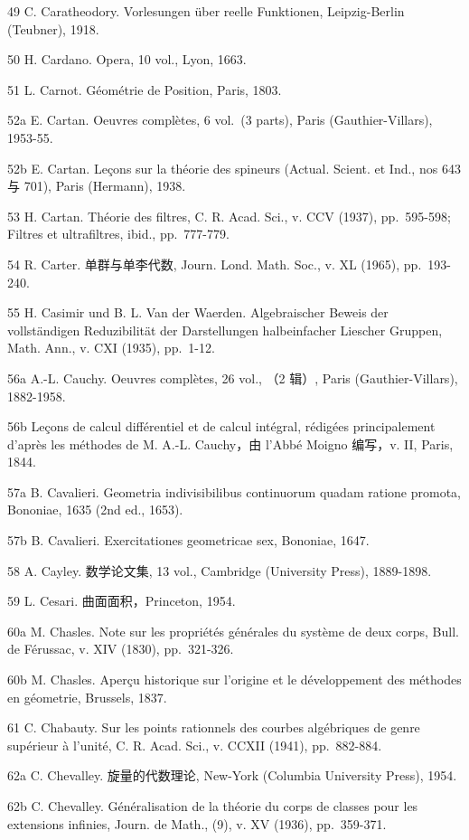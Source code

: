 49 C. Caratheodory. Vorlesungen über reelle Funktionen, Leipzig-Berlin (Teubner), 1918.

50 H. Cardano. Opera, 10 vol., Lyon, 1663.

51 L. Carnot. Géométrie de Position, Paris, 1803.

52a E. Cartan. Oeuvres complètes, 6 vol.~(3 parts), Paris (Gauthier-Villars), 1953-55.

52b E. Cartan. Leçons sur la théorie des spineurs (Actual. Scient. et Ind., nos 643 与 701), Paris (Hermann), 1938.

53 H. Cartan. Théorie des filtres, C. R. Acad. Sci., v. CCV (1937), pp.~595-598; Filtres et ultrafiltres, ibid., pp.~777-779.

54 R. Carter. 单群与单李代数, Journ. Lond. Math. Soc., v. XL (1965), pp.~193-240.

55 H. Casimir und B. L. Van der Waerden. Algebraischer Beweis der vollständigen Reduzibilität der Darstellungen halbeinfacher Liescher Gruppen, Math. Ann., v. CXI (1935), pp.~1-12.

56a A.-L. Cauchy. Oeuvres complètes, 26 vol., （2 辑）, Paris (Gauthier-Villars), 1882-1958.

56b Leçons de calcul différentiel et de calcul intégral, rédigées principalement d'après les méthodes de M. A.-L. Cauchy，由 l'Abbé Moigno 编写，v. II, Paris, 1844.

57a B. Cavalieri. Geometria indivisibilibus continuorum quadam ratione promota, Bononiae, 1635 (2nd ed., 1653).

57b B. Cavalieri. Exercitationes geometricae sex, Bononiae, 1647.

58 A. Cayley. 数学论文集, 13 vol., Cambridge (University Press), 1889-1898.

59 L. Cesari. 曲面面积，Princeton, 1954.

60a M. Chasles. Note sur les propriétés générales du système de deux corps, Bull. de Férussac, v. XIV (1830), pp.~321-326.

60b M. Chasles. Aperçu historique sur l'origine et le développement des méthodes en géometrie, Brussels, 1837.

61 C. Chabauty. Sur les points rationnels des courbes algébriques de genre supérieur à l'unité, C. R. Acad. Sci., v. CCXII (1941), pp.~882-884.

62a C. Chevalley. 旋量的代数理论, New-York (Columbia University Press), 1954.

62b C. Chevalley. Généralisation de la théorie du corps de classes pour les extensions infinies, Journ. de Math., (9), v. XV (1936), pp.~359-371.

